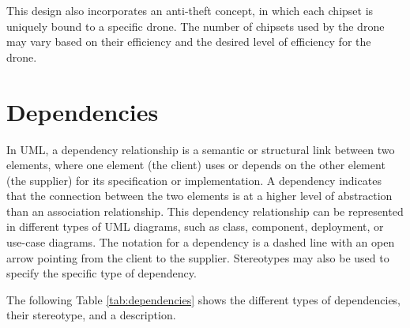 \documentclass[
	12pt,
    a4paper,
    egregdoesnotlikesansseriftitles, %
    toc=chapterentrywithdots,
    oneside, openany,
    titlepage,
    parskip=half,
    headings=normal,  %
    listof=totoc,
    bibliography=totocnumbered,
    index=totoc,
    captions=tableheading,  %
    listof=flat,
    numbers=noenddot, %
    final]
    {scrbook}
\begin{document}
This design also incorporates an anti-theft concept, in which each chipset is uniquely bound to a specific drone. The number of chipsets used by the drone may vary based on their efficiency and the desired level of efficiency for the drone.


\chapter{Dependencies}
In UML, a dependency relationship is a semantic or structural link between two elements, where one element (the client) uses or depends on the other element (the supplier) for its specification or implementation. 
A dependency indicates that the connection between the two elements is at a higher level of abstraction than an association relationship.
This dependency relationship can be represented in different types of UML diagrams, such as class, component, deployment, or use-case diagrams. 
The notation for a dependency is a dashed line with an open arrow pointing from the client to the supplier.
Stereotypes may also be used to specify the specific type of dependency. \cite[p. 159-160]{uml}

The following Table \ref{tab:dependencies} shows the different types of dependencies, their stereotype, and a description.
\end{document}
